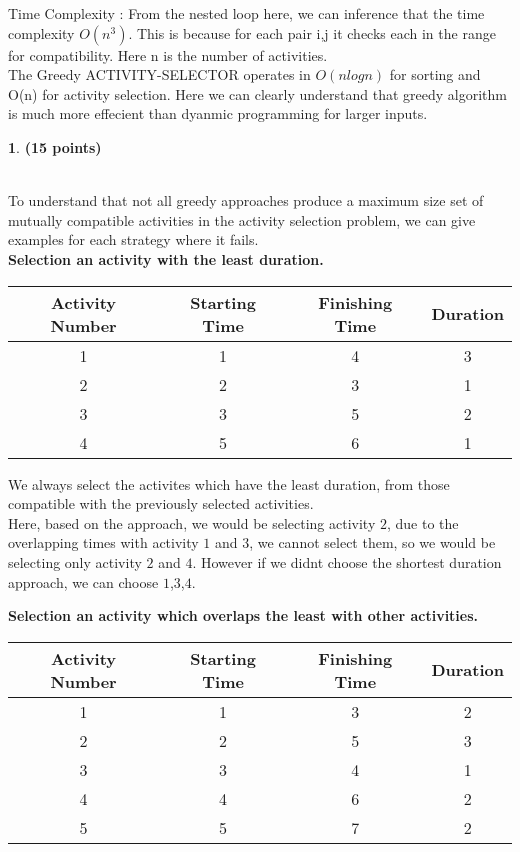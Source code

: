 \documentclass[11pt]{article}
\theoremstyle{definition}
\newtheorem{prob}{}
\newcommand{\solution}{\medskip\noindent{\color{DarkBlue}\textbf{Solution:}}}
\begin{document}
Time Complexity : From the nested loop here, we can inference that the time complexity $O(n^3)$. This is because for
each pair i,j it checks each in the range for compatibility. Here n is the number of activities.\\

The Greedy ACTIVITY-SELECTOR operates in $O(nlogn)$ for sorting and O(n) for activity selection. Here we can clearly
understand that greedy algorithm is much more effecient than dyanmic programming for larger inputs.

\begin{prob} \textbf{(15 points)}
\end{prob}

\solution \\

To understand that not all greedy approaches produce a maximum size set of mutually compatible activities in the activity selection problem,
we can give examples for each strategy where it fails. \\

\textbf{Selection an activity with the least duration.} \\

\begin{tabular}{|c|c|c|c|}
    \hline
    Activity Number & Starting Time & Finishing Time & Duration \\
    \hline
    1 & 1 & 4 & 3 \\
    2 & 2 & 3 & 1 \\
    3 & 3 & 5 & 2 \\
    4 & 5 & 6 & 1 \\
    
    \hline
\end{tabular}

We always select the activites which have the least duration, from those compatible with the previously selected activities. \\

Here, based on the approach, we would be selecting activity $2$, due to the overlapping times with activity $1$ and $3$,
we cannot select them, so we would be selecting only activity $2$ and $4$. However if we didnt choose the shortest duration approach,
we can choose $1$,$3$,$4$.

\textbf{Selection an activity which overlaps the least with other activities.} \\

\begin{tabular}{|c|c|c|c|}
    \hline
    Activity Number & Starting Time & Finishing Time & Duration \\
    \hline
    1 & 1 & 3 & 2 \\
    2 & 2 & 5 & 3 \\
    3 & 3 & 4 & 1 \\
    4 & 4 & 6 & 2 \\
    5 & 5 & 7 & 2 \\
    
    \hline
\end{tabular}
\end{document}
